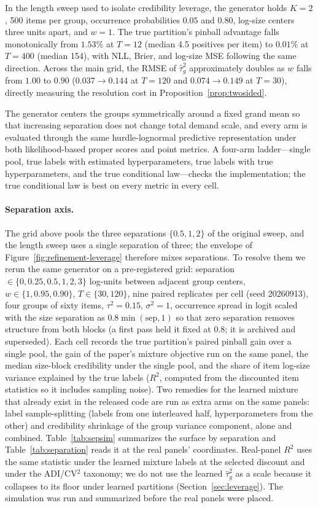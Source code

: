 In the length sweep used to isolate credibility leverage, the generator
holds $K=2$, 500 items per group, occurrence probabilities $0.05$ and
$0.80$, log-size centers three units apart, and $w=1$. The true
partition's pinball advantage falls monotonically from $1.53\%$ at
$T=12$ (median 4.5 positives per item) to $0.01\%$ at $T=400$ (median
154), with NLL, Brier, and log-size MSE following the same direction.
Across the main grid, the RMSE of $\hat\tau_g^2$ approximately doubles
as $w$ falls from $1.00$ to $0.90$ ($0.037\to0.144$ at $T=120$ and
$0.074\to0.149$ at $T=30$), directly measuring the resolution cost in
Proposition~\ref{prop:twosided}.

The generator centers the groups symmetrically around a fixed grand mean
so that increasing separation does not change total demand scale, and
every arm is evaluated through the same hurdle-lognormal predictive
representation under both likelihood-based proper scores and point
metrics. A four-arm ladder---single pool, true labels with estimated
hyperparameters, true labels with true hyperparameters, and the true
conditional law---checks the implementation; the true conditional law is
best on every metric in every cell.

\paragraph{Separation axis.} The grid above pools the three separations
$\{0.5,1,2\}$ of the original sweep, and the length sweep uses a single
separation of three; the envelope of Figure~\ref{fig:refinement-leverage}
therefore mixes separations. To resolve them we rerun the same generator
on a pre-registered grid: separation $\in\{0,0.25,0.5,1,2,3\}$ log-units
between adjacent group centers, $w\in\{1,0.95,0.90\}$, $T\in\{30,120\}$,
nine paired replicates per cell (seed 20260913), four groups of sixty
items, $\tau^2=0.15$, $\sigma^2=1$, occurrence spread in logit scaled
with the size separation as $0.8\min(\mathrm{sep},1)$ so that zero
separation removes structure from both blocks (a first pass held it fixed
at $0.8$; it is archived and superseded). Each cell records the true partition's paired pinball gain over a
single pool, the gain of the paper's mixture objective run on the same
panel, the median size-block credibility under the single pool, and the
share of item log-size variance explained by the true labels ($R^2$,
computed from the discounted item statistics so it includes sampling
noise). Two remedies for the learned mixture that already exist in the released
code are run as extra arms on the same panels: label sample-splitting
(labels from one interleaved half, hyperparameters from the other) and
credibility shrinkage of the group variance component, alone and
combined. Table~\ref{tab:sepsim} summarizes
the surface by separation and Table~\ref{tab:separation} reads it at the
real panels' coordinates. Real-panel $R^2$ uses the same statistic under
the learned mixture labels at the selected discount and under the
ADI/CV$^2$ taxonomy; we do not use the learned $\hat\tau_g^2$ as a scale
because it collapses to its floor under learned partitions
(Section~\ref{sec:leverage}). The simulation was run and summarized
before the real panels were placed.

